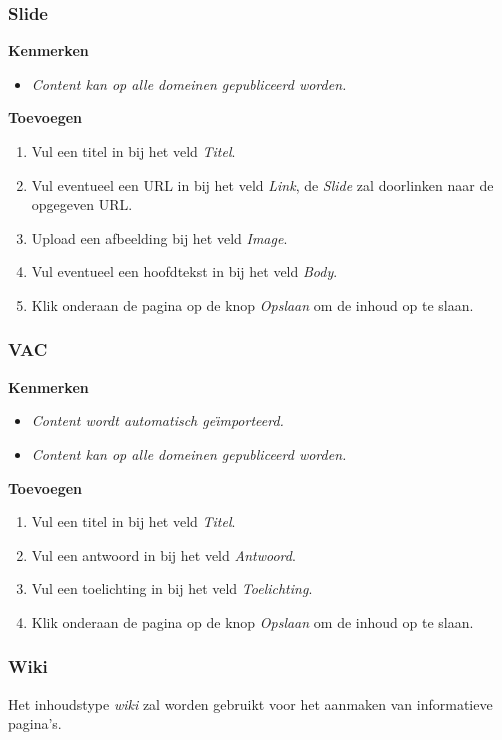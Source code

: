 \subsubsection{Slide}\label{slide}

\textbf{Kenmerken}

\begin{itemize}
\item \emph{Content kan op alle domeinen gepubliceerd worden.}
\end{itemize}

\textbf{Toevoegen}

\begin{enumerate}
\item Vul een titel in bij het veld \emph{Titel}.
\item Vul eventueel een URL in bij het veld \emph{Link}, de \emph{Slide} zal doorlinken naar de opgegeven URL.
\item Upload een afbeelding bij het veld \emph{Image}.
\item Vul eventueel een hoofdtekst in bij het veld \emph{Body}.
\item Klik onderaan de pagina op de knop \emph{Opslaan} om de inhoud op te slaan.
\end{enumerate}

\subsubsection{VAC}\label{vac}

\textbf{Kenmerken}

\begin{itemize}
\item \emph{Content wordt automatisch ge{\"\i}mporteerd.}
\item \emph{Content kan op alle domeinen gepubliceerd worden.}
\end{itemize}

\textbf{Toevoegen}

\begin{enumerate}
\item Vul een titel in bij het veld \emph{Titel}.
\item Vul een antwoord in bij het veld \emph{Antwoord}.
\item Vul een toelichting in bij het veld \emph{Toelichting}.
\item Klik onderaan de pagina op de knop \emph{Opslaan} om de inhoud op te slaan.
\end{enumerate}

\subsubsection{Wiki}\label{wiki}
Het inhoudstype \emph{wiki} zal worden gebruikt voor het aanmaken van informatieve pagina's.


